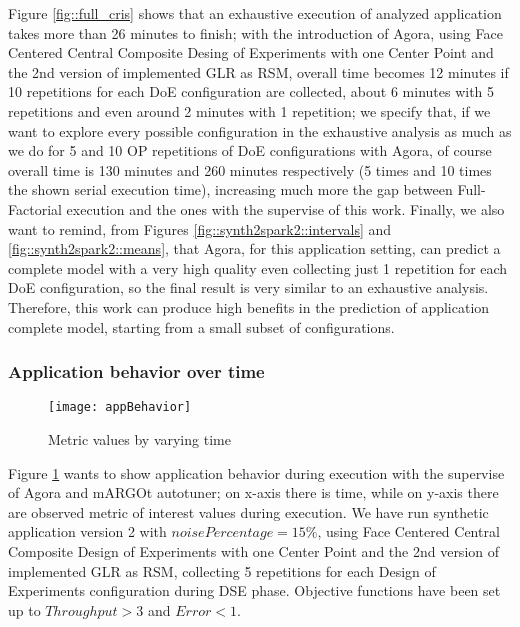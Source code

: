 Figure \ref{fig::full_cris} shows that an exhaustive execution of analyzed application takes more than 26 minutes to finish; with the introduction of Agora, using Face Centered Central Composite Desing of Experiments with one Center Point and the 2nd version of implemented GLR as RSM, overall time becomes 12 minutes if 10 repetitions for each DoE configuration are collected, about 6 minutes with 5 repetitions and even around 2 minutes with 1 repetition; we specify that, if we want to explore every possible configuration in the exhaustive analysis as much as we do for 5 and 10 OP repetitions of DoE configurations with Agora, of course overall time is 130 minutes and 260 minutes respectively (5 times and 10 times the shown serial execution time), increasing much more the gap between Full-Factorial execution and the ones with the supervise of this work. Finally, we also want to remind, from Figures \ref{fig::synth2spark2::intervals} and \ref{fig::synth2spark2::means}, that Agora, for this application setting, can predict a complete model with a very high quality even collecting just 1 repetition for each DoE configuration, so the final result is very similar to an exhaustive analysis. Therefore, this work can produce high benefits in the prediction of application complete model, starting from a small subset of configurations.


\subsubsection{Application behavior over time}

\begin{figure}[htb]

    \centering
    \texttt{[image: appBehavior]}
    \caption{Metric values by varying time}
    \label{fig::appBeh}
    
\end{figure}

Figure \ref{fig::appBeh} wants to show application behavior during execution with the supervise of Agora and mARGOt autotuner; on x-axis there is time, while on y-axis there are observed metric of interest values during execution. We have run synthetic application version 2 with $noisePercentage = 15\%$, using Face Centered Central Composite Design of Experiments with one Center Point and the 2nd version of implemented GLR as RSM, collecting 5 repetitions for each Design of Experiments configuration during DSE phase. Objective functions have been set up to $Throughput > 3$ and $Error < 1$.

